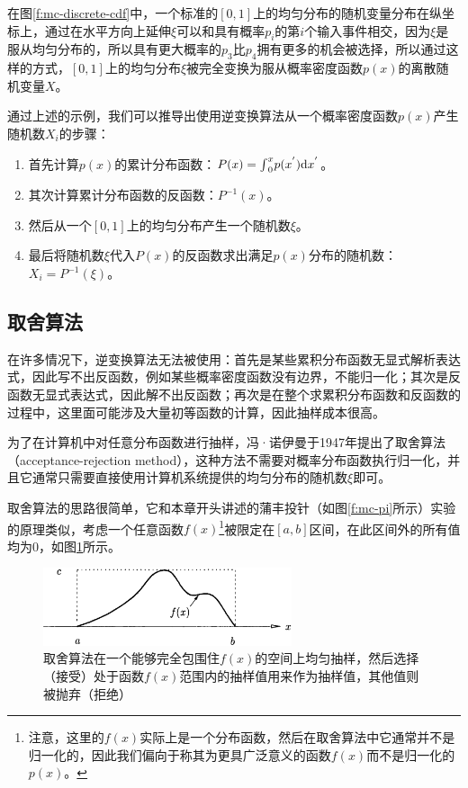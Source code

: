 在图\ref{f:mc-discrete-cdf}中，一个标准的$[0,1]$上的均匀分布的随机变量分布在纵坐标上，通过在水平方向上延伸$\xi$可以和具有概率$p_i$的第$i$个输入事件相交，因为$\xi$是服从均匀分布的，所以具有更大概率的$p_3$比$p_4$拥有更多的机会被选择，所以通过这样的方式，$[0,1]$上的均匀分布$\xi$被完全变换为服从概率密度函数$p(x)$的离散随机变量$X$。

通过上述的示例，我们可以推导出使用逆变换算法从一个概率密度函数$p(x)$产生随机数$X_i$的步骤：

\begin{enumerate}
	\item 首先计算$p(x)$的累计分布函数：$P(x)={\rm \int}_{0}^{x}p(x^{'}){\rm d}x^{'}$。
	\item 其次计算累计分布函数的反函数：$P^{-1}(x)$。
	\item 然后从一个$[0,1]$上的均匀分布产生一个随机数$\xi$。
	\item 最后将随机数$\xi$代入$P(x)$的反函数求出满足$p(x)$分布的随机数：$X_i=P^{-1}(\xi)$。
\end{enumerate}




\subsection{取舍算法}\label{sec:mc-accept-reject}
在许多情况下，逆变换算法无法被使用：首先是某些累积分布函数无显式解析表达式，因此写不出反函数，例如某些概率密度函数没有边界，不能归一化；其次是反函数无显式表达式，因此解不出反函数；再次是在整个求累积分布函数和反函数的过程中，这里面可能涉及大量初等函数的计算，因此抽样成本很高。

为了在计算机中对任意分布函数进行抽样，冯·诺伊曼于1947年提出了取舍算法（acceptance-rejection method），这种方法不需要对概率分布函数执行归一化，并且它通常只需要直接使用计算机系统提供的均匀分布的随机数$\xi$即可。

取舍算法的思路很简单，它和本章开头讲述的蒲丰投针（如图\ref{f:mc-pi}所示）实验的原理类似，考虑一个任意函数$f(x)$\footnote{注意，这里的$f(x)$实际上是一个分布函数，然后在取舍算法中它通常并不是归一化的，因此我们偏向于称其为更具广泛意义的函数$f(x)$而不是归一化的$p(x)$。}被限定在$[a,b]$区间，在此区间外的所有值均为0，如图\ref{f:mc-rejection-idea}所示。

\begin{figure}
\sidecaption
	\includegraphics[width=0.65\textwidth]{figures/mc/mc-6}
	\caption{取舍算法在一个能够完全包围住$f(x)$的空间上均匀抽样，然后选择（接受）处于函数$f(x)$范围内的抽样值用来作为抽样值，其他值则被抛弃（拒绝）}
	\label{f:mc-rejection-idea}
\end{figure}

